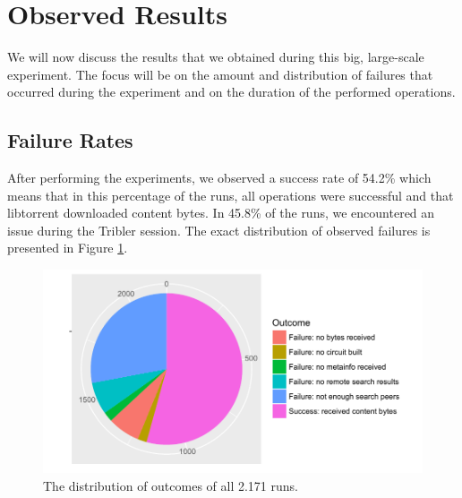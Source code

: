 

\section{Observed Results}
We will now discuss the results that we obtained during this big, large-scale experiment. The focus will be on the amount and distribution of failures that occurred during the experiment and on the duration of the performed operations.

\subsection{Failure Rates}
After performing the experiments, we observed a success rate of 54.2\% which means that in this percentage of the runs, all operations were successful and that libtorrent downloaded content bytes. In 45.8\% of the runs, we encountered an issue during the Tribler session. The exact distribution of observed failures is presented in Figure \ref{fig:big-experiment-outcome-pie}.

\begin{figure}[!h]
	\centering
	\includegraphics[width=0.7\columnwidth]{images/big_experiment/outcome_pie}
	\caption{The distribution of outcomes of all 2.171 runs.}
	\label{fig:big-experiment-outcome-pie}
\end{figure}


